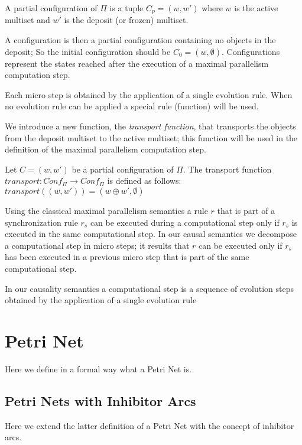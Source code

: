 \begin{definition}
A partial configuration of $\Pi$ is a tuple $C_p=(w,w')$ 
where $w$ is the active multiset and $w'$ is the deposit (or frozen) multiset.
\end{definition}

A configuration is then a partial configuration containing no objects in the deposit;
So the initial configuration should be $C_0=(w,\emptyset)$.
Configurations represent the states reached after the execution of a maximal parallelism computation step.

Each micro step is obtained by the application of a single evolution rule.
When no evolution rule can be applied a special rule (function) will be used.

We introduce a new function, the \textit{transport function}, that transports the objects from the deposit multiset to the active multiset; this function will be used in the definition of the maximal parallelism computation step.

\begin{definition}
Let $C=(w,w')$ be a partial configuration of $\Pi$.\newline
The transport function $transport: Conf_\Pi \rightarrow Conf_\Pi$ is defined as follows:\newline
$transport((w,w'))=(w \oplus w', \emptyset)$
\end{definition}

Using the classical maximal parallelism semantics a rule $r$ that is part of a synchronization rule $r_s$ can be executed during a computational step only if $r_s$ is executed in the same computational step.
In our causal semantics we decompose a computational step in micro steps; it results that $r$ can be executed only if $r_s$ has been executed in a previous micro step that is part of the same computational step.

\begin{definition}
In our causality semantics a computational step is a sequence of evolution steps obtained by the application of a single evolution rule
\end{definition}

\section{Petri Net}

Here we define in a formal way what a Petri Net is.

\subsection{Petri Nets with Inhibitor Arcs}

Here we extend the latter definition of a Petri Net with the concept of inhibitor arcs.
